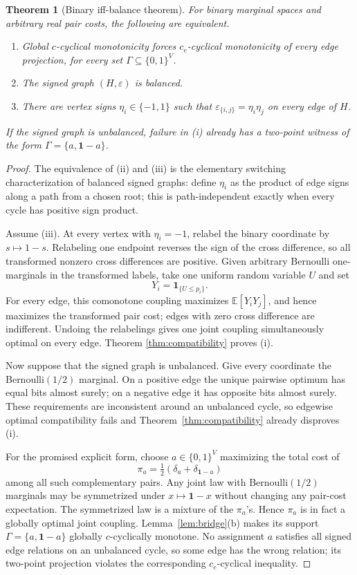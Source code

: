 \documentclass[11pt]{article}
\newtheorem{theorem}{Theorem}
\newcommand{\1}{\mathbf 1}
\begin{document}
\begin{theorem}[Binary iff-balance theorem]\label{thm:binary}
For binary marginal spaces and arbitrary real pair costs, the following are
equivalent.
\begin{enumerate}[label=\textup{(\roman*)}]
\item Global $c$-cyclical monotonicity forces $c_e$-cyclical monotonicity of
every edge projection, for every set $\Gamma\subseteq\{0,1\}^V$.
\item The signed graph $(H,\varepsilon)$ is balanced.
\item There are vertex signs $\eta_i\in\{-1,1\}$ such that
$\varepsilon_{\{i,j\}}=\eta_i\eta_j$ on every edge of $H$.
\end{enumerate}
If the signed graph is unbalanced, failure in (i) already has a two-point
witness of the form $\Gamma=\{a,\mathbf1-a\}$.
\end{theorem}

\begin{proof}
The equivalence of (ii) and (iii) is the elementary switching
characterization of balanced signed graphs: define $\eta_i$ as the product
of edge signs along a path from a chosen root; this is path-independent
exactly when every cycle has positive sign product.

Assume (iii).  At every vertex with $\eta_i=-1$, relabel the binary
coordinate by $s\mapsto1-s$.  Relabeling one endpoint reverses the sign of
the cross difference, so all transformed nonzero cross differences are
positive.  Given arbitrary Bernoulli one-marginals in the transformed
labels, take one uniform random variable $U$ and set
\[
 Y_i=\1_{\{U\leq p_i\}}.
\]
For every edge, this comonotone coupling maximizes
$\mathbb E[Y_iY_j]$, and hence maximizes the transformed pair cost; edges
with zero cross difference are indifferent.  Undoing the relabelings gives
one joint coupling simultaneously optimal on every edge.  Theorem
\ref{thm:compatibility} proves (i).

Now suppose that the signed graph is unbalanced.  Give every coordinate the
Bernoulli$(1/2)$ marginal.  On a positive edge the unique pairwise optimum
has equal bits almost surely; on a negative edge it has opposite bits almost
surely.  These requirements are inconsistent around an unbalanced cycle,
so edgewise optimal compatibility fails and Theorem~\ref{thm:compatibility}
already disproves (i).

For the promised explicit form, choose $a\in\{0,1\}^V$ maximizing the total
cost of
\[
 \pi_a=\tfrac12(\delta_a+\delta_{\mathbf1-a})
\]
among all such complementary pairs.  Any joint law with Bernoulli$(1/2)$
marginals may be symmetrized under $x\mapsto\mathbf1-x$ without changing
any pair-cost expectation.  The symmetrized law is a mixture of the
$\pi_a$'s.  Hence $\pi_a$ is in fact a globally optimal joint coupling.
Lemma~\ref{lem:bridge}(b) makes its support
$\Gamma=\{a,\mathbf1-a\}$ globally $c$-cyclically monotone.  No assignment
$a$ satisfies all signed edge relations on an unbalanced cycle, so some
edge has the wrong relation; its two-point projection violates the
corresponding $c_e$-cyclical inequality.
\end{proof}
\end{document}
